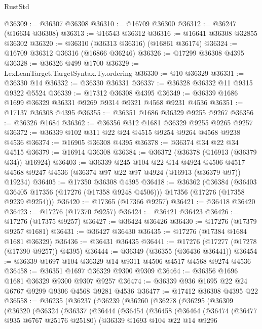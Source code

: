 \begin{lexlean}{RustStd}
\begin{coremodule}
@36309 := @36307 @36308
@36310 := @16709 @36300
@36312 := @36247 (@16634 @36308)
@36313 := @16543 @36312
@36316 := @16641 @36308 @32855 @36302
@36320 := @36310 (@36313 @36316) (@16861 @36174)
@36324 := @16709 @36312 @36316 (@16866 @36246)
@36326 := @17299 @36308 @4395
@36328 := @36326 @499 @1700
@36329 := LexLeanTarget.TargetSyntax.Ty.ordering
@36330 := @10 @36329
@36331 := @36330 @14
@36332 := @36330 @36331
@36337 := @36328 @36332 @11 @9315 @9322 @5524
@36339 := @17312 @36308 @4395
@36349 := @36339 @1686 @1699 @36329 @36331 @9269 @9314 @9321 @4568 @9231 @4536
@36351 := @17137 @36308 @4395
@36355 := @36351 @1686 @36329 @9255 @9267
@36356 := @36326 @1684
@36362 := @36356 @312 @1681 @36329 @9255 @9265 @9257
@36372 := @36339 @102 @311 @22 @24 @4515 @9254 @9264 @4568 @9238 @4536
@36374 := @16905 @36308 @4395
@36378 := @36374 @34 @22 @34 @4515
@36379 := @16914 @36308
@36384 := @36372 (@36378 (@16913 (@36379 @34)) @16924)
@36403 := @36339
    @245
    @104
    @22
    @14
    @4924
    @4506
    @4517
    @4568
    @9247
    @4536
    (@36374 @97 @22 @97 @4924 (@16913 (@36379 @97)) @19234)
@36405 := @17350 @36308 @4395
@36418 := @36362
    (@36384
      (@36403 @36405 @17356 (@17276 (@17358 @9248 @4506)))
      @17356
      (@17276 (@17358 @9239 @9254)))
@36420 := @17365 (@17366 @9257)
@36421 := @36418 @36420
@36423 := @17276 (@17370 @9257)
@36424 := @36421 @36423
@36426 := @17276 (@17375 @9257)
@36427 := @36424 @36426
@36430 := @17276 (@17379 @9257 @1681)
@36431 := @36427 @36430
@36435 := @17276 (@17384 @1684 @1681 @36329)
@36436 := @36431 @36435
@36441 := @17276 (@17277 (@17278 (@17390 @9257)) @4395)
@36444 := @36349 (@36355 (@36436 @36441))
@36454 := @36339 @1697 @104 @36329 @14 @9311 @4506 @4517 @4568 @9274 @4536
@36458 := @36351 @1697 @36329 @9300 @9309
@36464 := @36356 @1696 @1681 @36329 @9300 @9307 @9257
@36474 := @36339 @936 @1695 @22 @24 @6767 @9299 @9306 @4568 @9281 @4536
@36477 := @17412 @36308 @4395 @22
@36558 := @36235
    (@36237
      (@36239
        (@36260
          (@36278
            (@36295
              (@36309
                (@36320
                  (@36324
                    (@36337
                      (@36444
                        (@36454
                          (@36458
                            (@36464
                              (@36474
                                (@36477 @935 @6767 @25176 @25180)
                                (@36339
                                  @1693
                                  @104
                                  @22
                                  @14
                                  @9296

\end{coremodule}
\end{lexlean}
